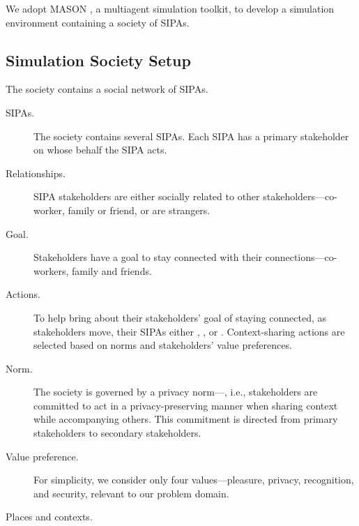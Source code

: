 We adopt MASON \citep{Luke-2005-Mason}, a multiagent simulation toolkit, to develop a simulation environment containing a society of \locationapp SIPAs. 

\subsection{Simulation Society Setup}
\label{sec:simulation-setup}

The society contains a social network of \locationapp SIPAs. 

\begin{description}

\item[SIPAs.] The society contains several SIPAs. Each SIPA has a primary stakeholder on whose behalf the SIPA acts.  

\item[Relationships.] SIPA stakeholders are either socially related to other stakeholders---co-worker, family or friend, or are strangers. 

\item[Goal.] Stakeholders have a goal to stay connected with their connections---co-workers, family and friends. 


\item[Actions.] To help bring about their stakeholders' goal of staying connected, as stakeholders move, their SIPAs either , , or . Context-sharing actions are selected based on norms and stakeholders' value preferences.

\item[Norm.] The society is governed by a privacy norm---, i.e., stakeholders are committed to act in a privacy-preserving manner when sharing context while accompanying others. This commitment is directed from primary stakeholders to secondary stakeholders.  

\item[Value preference.] For simplicity, we consider only four values---pleasure, privacy, recognition, and security, relevant to our problem domain.  

\item[Places and contexts.]


\end{description}
